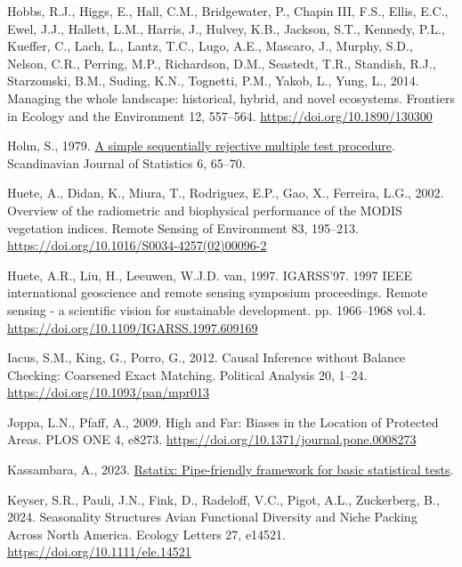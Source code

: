 \documentclass[
]{agujournal2019}
\newlength{\cslhangindent}
\newenvironment{CSLReferences}[2] %
 {\begin{list}{}{%
  \setlength{\itemindent}{0pt}
  \setlength{\leftmargin}{0pt}
  \setlength{\parsep}{0pt}
  \ifodd #1
   \setlength{\leftmargin}{\cslhangindent}
   \setlength{\itemindent}{-1\cslhangindent}
  \fi
  \setlength{\itemsep}{#2\baselineskip}}}
 {\end{list}}
\begin{document}
\begin{CSLReferences}{1}{0}
Hobbs, R.J., Higgs, E., Hall, C.M., Bridgewater, P., Chapin III, F.S.,
Ellis, E.C., Ewel, J.J., Hallett, L.M., Harris, J., Hulvey, K.B.,
Jackson, S.T., Kennedy, P.L., Kueffer, C., Lach, L., Lantz, T.C., Lugo,
A.E., Mascaro, J., Murphy, S.D., Nelson, C.R., Perring, M.P.,
Richardson, D.M., Seastedt, T.R., Standish, R.J., Starzomski, B.M.,
Suding, K.N., Tognetti, P.M., Yakob, L., Yung, L., 2014. Managing the
whole landscape: historical, hybrid, and novel ecosystems. Frontiers in
Ecology and the Environment 12, 557--564.
\url{https://doi.org/10.1890/130300}

Holm, S., 1979. \href{https://www.jstor.org/stable/4615733}{A simple
sequentially rejective multiple test procedure}. Scandinavian Journal of
Statistics 6, 65--70.

Huete, A., Didan, K., Miura, T., Rodriguez, E.P., Gao, X., Ferreira,
L.G., 2002. Overview of the radiometric and biophysical performance of
the MODIS vegetation indices. Remote Sensing of Environment 83,
195--213. \url{https://doi.org/10.1016/S0034-4257(02)00096-2}

Huete, A.R., Liu, H., Leeuwen, W.J.D. van, 1997. IGARSS'97. 1997 IEEE
international geoscience and remote sensing symposium proceedings.
Remote sensing - a scientific vision for sustainable development. pp.
1966--1968 vol.4. \url{https://doi.org/10.1109/IGARSS.1997.609169}

Iacus, S.M., King, G., Porro, G., 2012. Causal Inference without Balance
Checking: Coarsened Exact Matching. Political Analysis 20, 1--24.
\url{https://doi.org/10.1093/pan/mpr013}

Joppa, L.N., Pfaff, A., 2009. High and Far: Biases in the Location of
Protected Areas. PLOS ONE 4, e8273.
\url{https://doi.org/10.1371/journal.pone.0008273}

Kassambara, A., 2023.
\href{https://rpkgs.datanovia.com/rstatix/}{Rstatix: Pipe-friendly
framework for basic statistical tests}.

Keyser, S.R., Pauli, J.N., Fink, D., Radeloff, V.C., Pigot, A.L.,
Zuckerberg, B., 2024. Seasonality Structures Avian Functional Diversity
and Niche Packing Across North America. Ecology Letters 27, e14521.
\url{https://doi.org/10.1111/ele.14521}


\end{CSLReferences}
\end{document}
